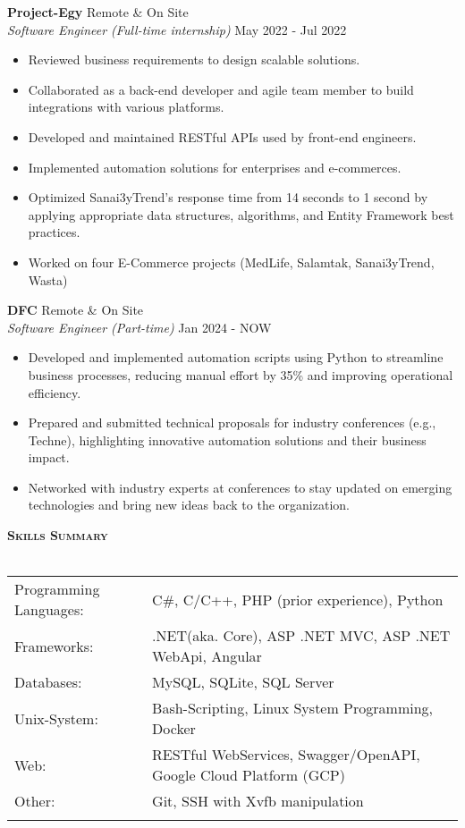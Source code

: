 \documentclass[a4paper]{article}
\newcommand{\lineunder} {
    \vspace*{-8pt} \\
    \hspace*{-18pt} \hrulefill \\
}
\newcommand{\header} [1] {
    {\hspace*{-18pt}\vspace*{6pt} \textsc{\textbf{#1}}}  %
    \vspace*{-6pt} \lineunder
}
\begin{document}
\textbf{Project-Egy} \hfill Remote \& On Site
\\
\textit{Software Engineer (Full-time internship)} \hfill May 2022 - Jul 2022
\begin{itemize} \itemsep -2pt 
    \item Reviewed business requirements to design scalable solutions.
    \item Collaborated as a back-end developer and agile team member to build integrations with various platforms.
    \item Developed and maintained RESTful APIs used by front-end engineers.
    \item Implemented automation solutions for enterprises and e-commerces.
    \item Optimized Sanai3yTrend's response time from 14 seconds to 1 second by applying appropriate data structures, algorithms, and Entity Framework best practices.
    \item Worked on four E-Commerce projects (MedLife, Salamtak, Sanai3yTrend, Wasta)
\end{itemize}
\textbf{DFC} \hfill Remote \& On Site
\\
\textit{Software Engineer (Part-time)} \hfill Jan 2024 - NOW
\begin{itemize} \itemsep -2pt 
    \item Developed and implemented automation scripts using Python to streamline business processes, reducing manual effort by 35\% and improving operational efficiency.
    \item Prepared and submitted technical proposals for industry conferences (e.g., Techne), highlighting innovative automation solutions and their business impact.
    \item Networked with industry experts at conferences to stay updated on emerging technologies and bring new ideas back to the organization.
\end{itemize}


\header{Skills Summary}
\vspace*{2mm}
\begin{tabular}{ll}
    Programming Languages: & C\#, C/C++, PHP (prior experience), Python \\
    Frameworks: & .NET(aka. Core), ASP .NET MVC, ASP .NET WebApi, Angular\\
    Databases: & MySQL, SQLite, SQL Server \\
    Unix-System: & Bash-Scripting, Linux System Programming, Docker \\
    Web: & RESTful WebServices, Swagger/OpenAPI, Google Cloud Platform (GCP) \\
    Other: & Git, SSH with Xvfb manipulation \\
\vspace*{2mm}
\end{tabular}
\end{document}
